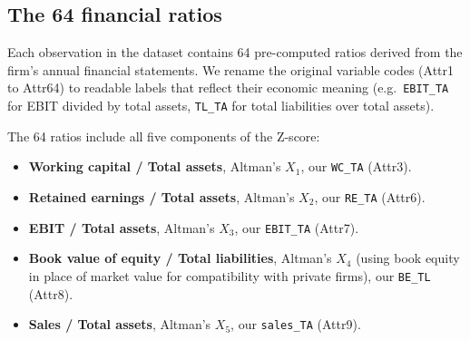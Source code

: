 \documentclass[12pt,a4paper]{article}
\begin{document}
\begin{table}[ht]
\centering
\caption{Sample sizes and class balance by prediction horizon.\textsuperscript{*}}
\label{tab:horizons}
\centering
{}
\caption*{\footnotesize \textsuperscript{*} The final two columns show the bankruptcy rate
(BR) separately for complete and incomplete rows, documenting the informative
missingness discussed in Section~\ref{sec:missing}. Source: author's
calculations.}
\end{table}

\subsection{The 64 financial ratios}
\label{sec:ratios}

Each observation in the dataset contains 64 pre-computed ratios derived from
the firm's annual financial statements. We rename the original variable codes
(Attr1 to Attr64) to readable labels that reflect their economic meaning
(e.g.\ \texttt{EBIT\_TA} for EBIT divided by total assets, \texttt{TL\_TA}
for total liabilities over total assets).

The 64 ratios include all five components of the \cite{altman1968} Z-score:

\begin{itemize}
\item \textbf{Working capital / Total assets}, Altman's $X_1$,
      our \texttt{WC\_TA} (Attr3).
\item \textbf{Retained earnings / Total assets}, Altman's $X_2$,
      our \texttt{RE\_TA} (Attr6).
\item \textbf{EBIT / Total assets}, Altman's $X_3$,
      our \texttt{EBIT\_TA} (Attr7).
\item \textbf{Book value of equity / Total liabilities}, Altman's $X_4$
      (using book equity in place of market value for compatibility with
      private firms), our \texttt{BE\_TL} (Attr8).
\item \textbf{Sales / Total assets}, Altman's $X_5$,
      our \texttt{sales\_TA} (Attr9).
\end{itemize}
\end{document}
